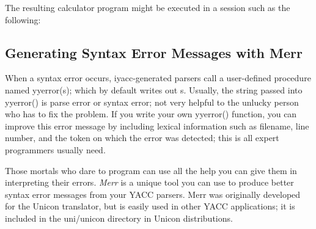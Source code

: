 \bigskip


The resulting calculator program might be executed in a session such as
the following:


\subsection[Generating Syntax Error Messages with Merr]{Generating
Syntax Error Messages with Merr}

When a syntax error occurs, iyacc-generated parsers call a
user-defined procedure named \textsf{yyerror(s)}; which by default
writes out \textsf{s}. Usually, the string passed into
\textsf{yyerror()} is {\textquotedbl}parse error{\textquotedbl} or
{\textquotedbl}syntax error{\textquotedbl}; not very helpful to the
unlucky person who has to fix the problem. If you write your own
\textsf{yyerror()} function, you can improve this error message by
including lexical information such as filename, line number, and the
token on which the error was detected; this is all expert programmers
usually need.

Those mortals who dare to program can use all the help you can give them
in interpreting their errors.\textit{ Merr} is a\textit{ }unique tool
you can use to produce better syntax error messages from your YACC
parsers. Merr was originally developed for the Unicon translator, but
is easily used in other YACC applications; it is included in the
uni/unicon directory in Unicon distributions.

